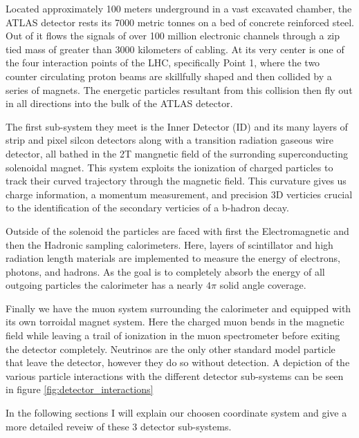 Located approximately 100 meters underground in a vast excavated chamber, the
ATLAS detector rests its 7000 metric tonnes on a bed of concrete reinforced
steel.  Out of it flows the signals of over 100 million electronic channels
through a zip tied mass of greater than 3000 kilometers of cabling.  At its very
center is one of the four interaction points of the LHC, specifically Point 1,
where the two counter circulating proton beams are skillfully shaped and then
collided by a series of magnets.  The energetic particles resultant from this
collision then fly out in all directions into the bulk of the ATLAS detector.

The first sub-system they meet is the Inner Detector (ID) and its many layers of
strip and pixel silcon detectors along with a transition radiation gaseous wire
detector, all bathed in the 2T mangnetic field of the surronding superconducting
solenoidal magnet.  This system exploits the ionization of charged particles to
track their curved trajectory through the magnetic field.  This curvature gives
us charge information, a momentum measurement, and precision 3D verticies
crucial to the identification of the secondary verticies of a b-hadron decay. 

Outside of the solenoid the particles are faced with first the Electromagnetic
and then the Hadronic sampling calorimeters. Here, layers of scintillator and
high radiation length materials are implemented to measure the energy of
electrons, photons, and hadrons. As the goal is to completely absorb the energy
of all outgoing particles the calorimeter has a nearly $4\pi$ solid angle
coverage.

Finally we have the muon system surrounding the calorimeter and equipped with
its own torroidal magnet system.  Here the charged muon bends in the magnetic
field while leaving a trail of ionization in the muon spectrometer before
exiting the detector completely.  Neutrinos are the only other standard model
particle that leave the detector, however they do so without detection.  A
depiction of the various particle interactions with the different detector
sub-systems can be seen in figure \ref{fig:detector_interactions}

In the following sections I will explain our choosen coordinate system and give 
a more detailed reveiw of these 3 detector sub-systems.

